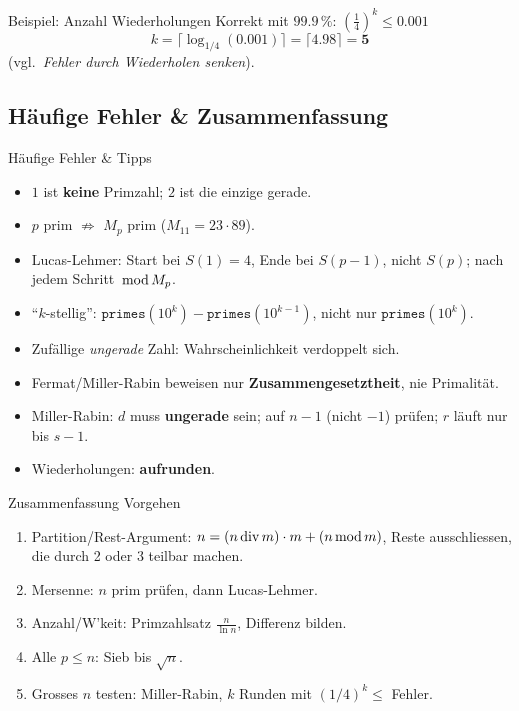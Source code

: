 \documentclass[a4paper, fontsize=7pt]{scrartcl}
\newcommand{\Div}{\mskip3mu\mathrm{div}\mskip3mu}
\newcommand{\Mod}{\mskip3mu\mathrm{mod}\mskip3mu}
\begin{document}
\begin{subbox}{Beispiel: Anzahl Wiederholungen}
Korrekt mit $99.9\,\%$: $\left(\frac{1}{4}\right)^k \le 0.001$
$$k = \lceil \log_{1/4}(0.001) \rceil = \lceil 4.98 \rceil = \mathbf{5}$$
(vgl.\ \emph{Fehler durch Wiederholen senken}).
\end{subbox}

\subsection{Häufige Fehler \& Zusammenfassung}

\begin{subbox}{Häufige Fehler \& Tipps}
\begin{itemize}
    \item $1$ ist \textbf{keine} Primzahl; $2$ ist die einzige gerade.
    \item $p$ prim $\not\Rightarrow$ $M_p$ prim ($M_{11} = 23 \cdot 89$).
    \item Lucas-Lehmer: Start bei $S(1) = 4$, Ende bei $S(p - 1)$, nicht $S(p)$;
          nach jedem Schritt $\Mod M_p$.
    \item ``$k$-stellig'': $\texttt{primes}(10^k) - \texttt{primes}(10^{k-1})$,
          nicht nur $\texttt{primes}(10^k)$.
    \item Zufällige \emph{ungerade} Zahl: Wahrscheinlichkeit verdoppelt sich.
    \item Fermat/Miller-Rabin beweisen nur \textbf{Zusammengesetztheit}, nie
          Primalität.
    \item Miller-Rabin: $d$ muss \textbf{ungerade} sein; auf $n - 1$
          (nicht $-1$) prüfen; $r$ läuft nur bis $s - 1$.
    \item Wiederholungen: \textbf{aufrunden}.
\end{itemize}
\end{subbox}

\begin{subbox}{Zusammenfassung Vorgehen}
\begin{enumerate}
    \item Partition/Rest-Argument: $n = (n \Div m) \cdot m + (n \Mod m)$,
          Reste ausschliessen, die durch 2 oder 3 teilbar machen.
    \item Mersenne: $n$ prim prüfen, dann Lucas-Lehmer.
    \item Anzahl/W'keit: Primzahlsatz $\frac{n}{\ln n}$, Differenz bilden.
    \item Alle $p \le n$: Sieb bis $\sqrt{n}$.
    \item Grosses $n$ testen: Miller-Rabin, $k$ Runden mit
          $(1/4)^k \le$ Fehler.
\end{enumerate}
\end{subbox}
\end{document}
